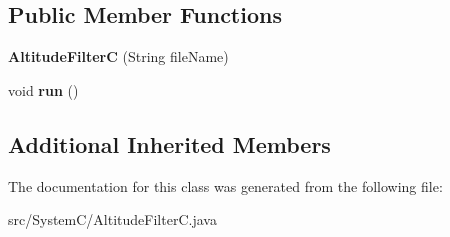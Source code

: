 \subsection*{Public Member Functions}
\begin{DoxyCompactItemize}
\item 
\hypertarget{class_system_c_1_1_altitude_filter_c_a67dd02d1a50b0bb52e857ec39035b53e}{}{\bfseries Altitude\+Filter\+C} (String file\+Name)\label{class_system_c_1_1_altitude_filter_c_a67dd02d1a50b0bb52e857ec39035b53e}

\item 
\hypertarget{class_system_c_1_1_altitude_filter_c_a2d4652a5384cf936b3e59819568a1b4a}{}void {\bfseries run} ()\label{class_system_c_1_1_altitude_filter_c_a2d4652a5384cf936b3e59819568a1b4a}

\end{DoxyCompactItemize}
\subsection*{Additional Inherited Members}


The documentation for this class was generated from the following file\+:\begin{DoxyCompactItemize}
\item 
src/\+System\+C/Altitude\+Filter\+C.\+java\end{DoxyCompactItemize}
